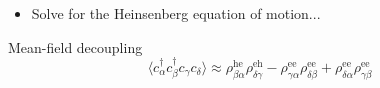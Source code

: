 \documentclass{beamer}
\begin{document}
\begin{frame}[noframenumbering]
\vspace*{4,5mm}
\begin{itemize} 
\item Solve for the Heinsenberg equation of motion...
\end{itemize}
\pause

\begin{alertblock}{Mean-field decoupling}
\begin{equation*}
\langle c_{\alpha}^{\dagger}c_{\beta}^{\dagger}c_{\gamma}c_{\delta}\rangle\approx\mathfrak{\rho}_{\beta\alpha}^{\text{he}}\mathfrak{\rho}_{\delta\gamma}^{\text{eh}}-\rho_{\gamma\alpha}^{\text{ee}}\rho_{\delta\beta}^{\text{ee}}+\rho_{\delta\alpha}^{\text{ee}}\rho_{\gamma\beta}^{\text{ee}}
\end{equation*}
\end{alertblock}

\end{frame}
\end{document}
